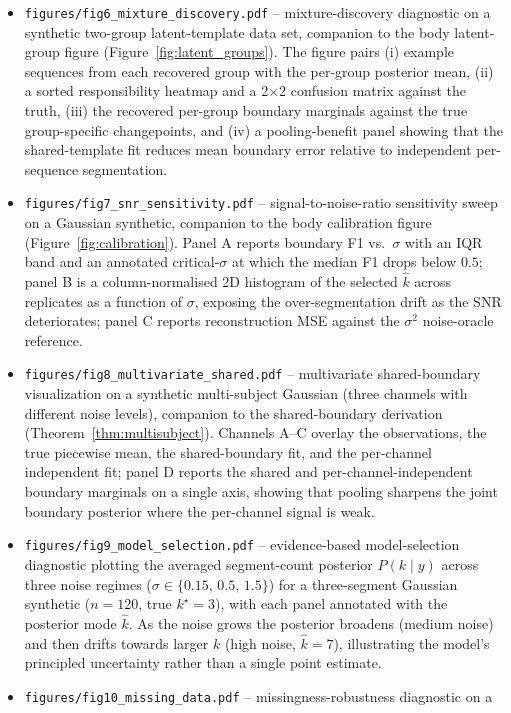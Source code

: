 \begin{itemize}\itemsep1pt
\item \texttt{figures/fig6\_mixture\_discovery.pdf} -- mixture-discovery diagnostic on a synthetic
two-group latent-template data set, companion to the body latent-group figure
(Figure~\ref{fig:latent_groups}). The figure pairs (i) example sequences from each recovered
group with the per-group posterior mean, (ii) a sorted responsibility heatmap and a 2$\times$2
confusion matrix against the truth, (iii) the recovered per-group boundary marginals against the
true group-specific changepoints, and (iv) a pooling-benefit panel showing that the shared-template
fit reduces mean boundary error relative to independent per-sequence segmentation.
\item \texttt{figures/fig7\_snr\_sensitivity.pdf} -- signal-to-noise-ratio sensitivity sweep on a
Gaussian synthetic, companion to the body calibration figure (Figure~\ref{fig:calibration}).
Panel A reports boundary F1 vs.\ $\sigma$ with an IQR band and an annotated critical-$\sigma$ at
which the median F1 drops below $0.5$; panel B is a column-normalised 2D histogram of the selected
$\hat k$ across replicates as a function of $\sigma$, exposing the over-segmentation drift as the
SNR deteriorates; panel C reports reconstruction MSE against the $\sigma^2$ noise-oracle reference.
\item \texttt{figures/fig8\_multivariate\_shared.pdf} -- multivariate shared-boundary visualization
on a synthetic multi-subject Gaussian (three channels with different noise levels), companion to
the shared-boundary derivation (Theorem~\ref{thm:multisubject}). Channels A--C overlay the
observations, the true piecewise mean, the shared-boundary fit, and the per-channel independent
fit; panel D reports the shared and per-channel-independent boundary marginals on a single axis,
showing that pooling sharpens the joint boundary posterior where the per-channel signal is weak.
\item \texttt{figures/fig9\_model\_selection.pdf} -- evidence-based model-selection diagnostic
plotting the averaged segment-count posterior $P(k\mid y)$ across three noise regimes
($\sigma\in\{0.15,\,0.5,\,1.5\}$) for a three-segment Gaussian synthetic ($n=120$, true
$k^{\star}=3$), with each panel annotated with the posterior mode $\hat k$. As the noise grows
the posterior broadens (medium noise) and then drifts towards larger $k$ (high noise, $\hat
k\!=\!7$), illustrating the model's principled uncertainty rather than a single point estimate.
\item \texttt{figures/fig10\_missing\_data.pdf} -- missingness-robustness diagnostic on a

\end{itemize}
